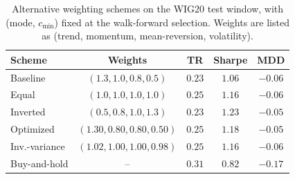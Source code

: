 \documentclass{ieeeaccess}
\newcommand{\TRtest}{\ensuremath{0.23}}
\newcommand{\Shtest}{\ensuremath{1.06}}
\newcommand{\MDDtest}{\ensuremath{-0.06}}
\newcommand{\BHtest}{\ensuremath{0.31}}
\newcommand{\BHsharpe}{\ensuremath{0.82}}
\newcommand{\MDDbh}{\ensuremath{-0.17}}
\newcommand{\WSEqualTR}{\ensuremath{0.25}}
\newcommand{\WSEqualSharpe}{\ensuremath{1.16}}
\newcommand{\WSEqualMDD}{\ensuremath{-0.06}}
\newcommand{\WSInvertedTR}{\ensuremath{0.23}}
\newcommand{\WSInvertedSharpe}{\ensuremath{1.23}}
\newcommand{\WSInvertedMDD}{\ensuremath{-0.05}}
\newcommand{\WSOptTR}{\ensuremath{0.25}}
\newcommand{\WSOptSharpe}{\ensuremath{1.18}}
\newcommand{\WSOptMDD}{\ensuremath{-0.05}}
\newcommand{\WSOptWtrend}{\ensuremath{1.30}}
\newcommand{\WSOptWmom}{\ensuremath{0.80}}
\newcommand{\WSOptWmr}{\ensuremath{0.80}}
\newcommand{\WSOptWvol}{\ensuremath{0.50}}
\newcommand{\WSIvTR}{\ensuremath{0.25}}
\newcommand{\WSIvSharpe}{\ensuremath{1.16}}
\newcommand{\WSIvMDD}{\ensuremath{-0.06}}
\newcommand{\WSIvWtrend}{\ensuremath{1.02}}
\newcommand{\WSIvWmom}{\ensuremath{1.00}}
\newcommand{\WSIvWmr}{\ensuremath{1.00}}
\newcommand{\WSIvWvol}{\ensuremath{0.98}}
\begin{document}
\begin{table}[t]
\centering
\caption{Alternative weighting schemes on the WIG20 test window, with (mode, $c_{\min}$) fixed at the walk-forward selection. Weights are listed as (trend, momentum, mean-reversion, volatility).}
\label{tab:weights}
\begin{tabular}{lcccc}
\toprule
Scheme & Weights & TR & Sharpe & MDD \\
\midrule
Baseline & $(1.3, 1.0, 0.8, 0.5)$ & $\TRtest$ & $\Shtest$ & $\MDDtest$ \\
Equal & $(1.0, 1.0, 1.0, 1.0)$ & $\WSEqualTR$ & $\WSEqualSharpe$ & $\WSEqualMDD$ \\
Inverted & $(0.5, 0.8, 1.0, 1.3)$ & $\WSInvertedTR$ & $\WSInvertedSharpe$ & $\WSInvertedMDD$ \\
Optimized & $(\WSOptWtrend, \WSOptWmom, \WSOptWmr, \WSOptWvol)$ & $\WSOptTR$ & $\WSOptSharpe$ & $\WSOptMDD$ \\
Inv.-variance & $(\WSIvWtrend, \WSIvWmom, \WSIvWmr, \WSIvWvol)$ & $\WSIvTR$ & $\WSIvSharpe$ & $\WSIvMDD$ \\
Buy-and-hold & -- & $\BHtest$ & $\BHsharpe$ & $\MDDbh$ \\
\bottomrule
\end{tabular}
\end{table}
\end{document}
